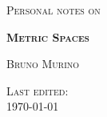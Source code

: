 \begin{titlepage}
    \begin{center}
        \vspace*{2cm}
        
        \Large
        \textsc{Personal notes on}
        
        
        \vspace{1cm}
        \Huge
        \textsc{ \textbf{Metric Spaces}}
        
        \vspace{1cm}
        \Large
        \textsc{ Bruno Murino}
        
        \vfill
        
        \textsc{ Last edited:}\\
        \textsc{ \today}
        
    \end{center}
\end{titlepage}